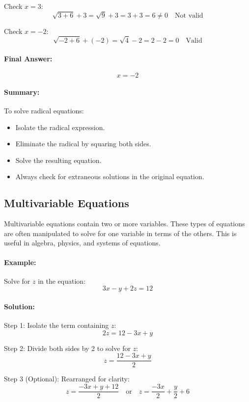 \documentclass[11pt]{article}
\begin{document}
Check \( x = 3 \):
\[
\sqrt{3 + 6} + 3 = \sqrt{9} + 3 = 3 + 3 = 6 \neq 0
\quad \text{Not valid}
\]

Check \( x = -2 \):
\[
\sqrt{-2 + 6} + (-2) = \sqrt{4} - 2 = 2 - 2 = 0
\quad \text{Valid}
\]

\paragraph{Final Answer:}
\[
\boxed{x = -2}
\]

\paragraph{Summary:}
To solve radical equations:
\begin{itemize}
  \item Isolate the radical expression.
  \item Eliminate the radical by squaring both sides.
  \item Solve the resulting equation.
  \item Always check for extraneous solutions in the original equation.
\end{itemize}

\subsection{Multivariable Equations}

Multivariable equations contain two or more variables. These types of equations are often manipulated to solve for one variable in terms of the others. This is useful in algebra, physics, and systems of equations.

\paragraph{Example:} Solve for \( z \) in the equation:
\[
3x - y + 2z = 12
\]

\paragraph{Solution:}

Step 1: Isolate the term containing \( z \):
\[
2z = 12 - 3x + y
\]

Step 2: Divide both sides by 2 to solve for \( z \):
\[
z = \frac{12 - 3x + y}{2}
\]

Step 3 (Optional): Rearranged for clarity:
\[
z = \frac{-3x + y + 12}{2}
\quad \text{or} \quad
z = \frac{-3x}{2} + \frac{y}{2} + 6
\]
\end{document}

